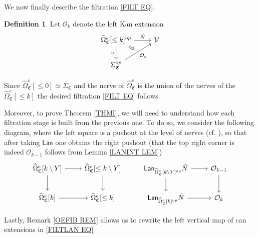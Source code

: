 \documentclass[a4paper,10pt
,draft
]{article}%
\numberwithin{equation}{section}
\numberwithin{figure}{section}
\theoremstyle{definition} %
\newtheorem{definition}[equation]{Definition}%
\newcommand{\V}{\ensuremath{\mathcal V}}
\renewcommand{\O}{\ensuremath{\mathcal O}}
\newcommand{\1}{\ensuremath{\mathbbm 1}}%
\newcommand{\SC}{\Sigma_{\mathfrak C}}
\begin{document}
We now finally describe the filtration \eqref{FILT EQ}.
\begin{definition}\label{FILTSTAGE DEF}
Let $\O_k$ denote the left Kan extension
\begin{equation}
\begin{tikzcd}
	|[alias = A]|
	\widehat\Omega_{\mathfrak C}^e[\leq k]^{op}
	\arrow[r, "\tilde N"] \arrow[d, "\mathsf{lr}"']
&
	\V
\\
	\SC^{op}
	\arrow[ur, "\O_k"', ""{name = B}]
	\arrow[Rightarrow, from = A, to = B]
\end{tikzcd}
\end{equation}
\end{definition}

Since $\widehat\Omega_{\mathfrak C}^e[\leq 0] \simeq \SC$
and the nerve of $\widehat \Omega_{\mathfrak C}^e$ is the union of the nerves of the $\widehat\Omega_{\mathfrak C}^e[\leq k]$
the desired filtration \eqref{FILT EQ} follows.


Moreover, to prove Theorem \ref{THMI}, we will need to
understand how each filtration stage is built from the previous one.
To do so, we consider the following diagram, where the left square is a pushout at the level of nerves (cf. \cite[(5.65)]{BP_geo}),
so that after taking $\mathsf{Lan}$
one obtains the right pushout
(that the top right corner is indeed $\O_{k-1}$ follows from Lemma \ref{LANINT LEM})
\begin{equation}\label{FILTLAN EQ}
\begin{tikzcd}
		\widehat\Omega_{\mathfrak C}^e[k \setminus Y] \arrow[r] \arrow[d]
	&
		\widehat\Omega_{\mathfrak C}^e[\leq k \setminus Y] \arrow[d]
&
		\mathsf{Lan}_{\widehat\Omega_{\mathfrak C}^e[k \setminus Y]^{op}} \tilde N \arrow[r] \arrow[d]
	&
		\O_{k-1} \arrow[d]
\\
		\widehat\Omega_{\mathfrak C}^e[k] \arrow[r]
	&
		\widehat\Omega_{\mathfrak C}^e[\leq k]
&
		\mathsf{Lan}_{\widehat \Omega_{\mathfrak C}^e[k]^{op}} \tilde N \arrow[r]
	&
		\O_k
\end{tikzcd}
\end{equation}


Lastly, Remark \ref{OEFIB REM} allows us to 
rewrite the left vertical map of can extensions in \eqref{FILTLAN EQ}
\end{document}
